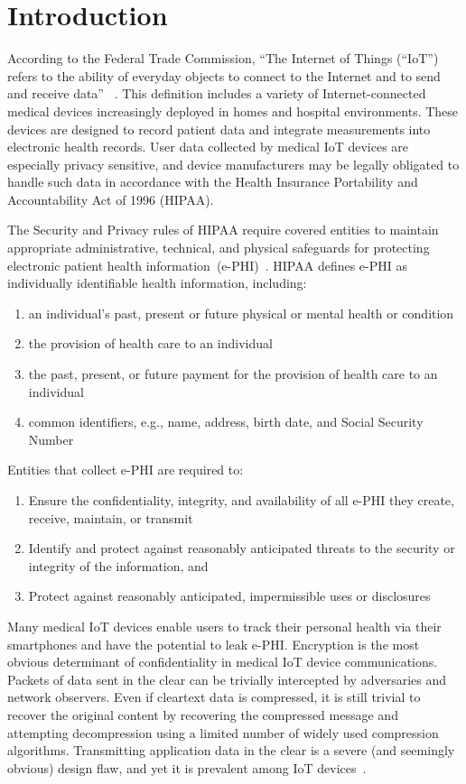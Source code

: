 \section{Introduction}

According to the Federal Trade Commission, ``The Internet of Things (``IoT'') refers to the ability of everyday objects to connect to the Internet and to send and receive data'' ~\cite{ftc}. This definition includes a variety of Internet-connected medical devices increasingly deployed in homes and hospital environments. These devices are designed to record patient data and integrate measurements into electronic health records. User data collected by medical IoT devices are especially privacy sensitive, and device manufacturers may be legally obligated to handle such data in accordance with the Health Insurance Portability and Accountability Act of 1996 (HIPAA). 

The Security and Privacy rules of HIPAA require covered entities to maintain appropriate
administrative, technical, and physical safeguards for protecting electronic patient health information~(e-PHI)~\cite{securityHIPAArule, privacyHIPAArule}. HIPAA defines e-PHI as individually identifiable health information, including:
\begin{enumerate}
  \item an individual's past, present or future physical or mental health or condition
  \item the provision of health care to an individual
  \item the past, present, or future payment for the provision of health care to an individual
  \item common identifiers, e.g., name, address, birth date, and  Social Security Number
\end{enumerate}
Entities that collect e-PHI are required to:
\begin{enumerate}
  \item Ensure the confidentiality, integrity, and availability of all e-PHI they create, receive, maintain, or transmit
  \item Identify and protect against reasonably anticipated threats to the security or integrity of the information, and
  \item Protect against reasonably anticipated, impermissible uses or disclosures
\end{enumerate}
\noindent
Many medical IoT devices enable users to track their personal health via their
smartphones and have the potential to leak e-PHI.  Encryption is the most
obvious determinant of confidentiality in medical IoT device communications.
Packets of data sent in the clear can be trivially intercepted by adversaries
and network observers. Even if cleartext data is compressed, it is still
trivial to recover the original content by recovering the compressed message
and attempting decompression using a limited number of widely used compression
algorithms. Transmitting application data in the clear is a severe (and
seemingly obvious) design flaw, and yet it is prevalent among IoT
devices~\cite{tinker}.

